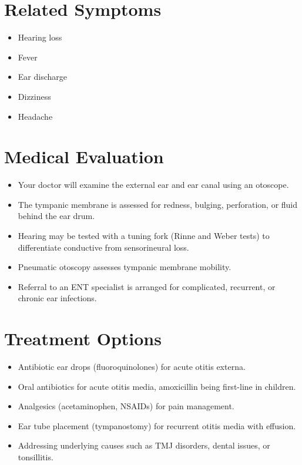 \section*{Related Symptoms}
\begin{itemize}
  \item Hearing loss
  \item Fever
  \item Ear discharge
  \item Dizziness
  \item Headache
\end{itemize}

\section*{Medical Evaluation}
\begin{itemize}
  \item Your doctor will examine the external ear and ear canal using an otoscope.
  \item The tympanic membrane is assessed for redness, bulging, perforation, or fluid behind the ear drum.
  \item Hearing may be tested with a tuning fork (Rinne and Weber tests) to differentiate conductive from sensorineural loss.
  \item Pneumatic otoscopy assesses tympanic membrane mobility.
  \item Referral to an ENT specialist is arranged for complicated, recurrent, or chronic ear infections.
\end{itemize}

\section*{Treatment Options}
\begin{itemize}
  \item Antibiotic ear drops (fluoroquinolones) for acute otitis externa.
  \item Oral antibiotics for acute otitis media, amoxicillin being first-line in children.
  \item Analgesics (acetaminophen, NSAIDs) for pain management.
  \item Ear tube placement (tympanostomy) for recurrent otitis media with effusion.
  \item Addressing underlying causes such as TMJ disorders, dental issues, or tonsillitis.
\end{itemize}


